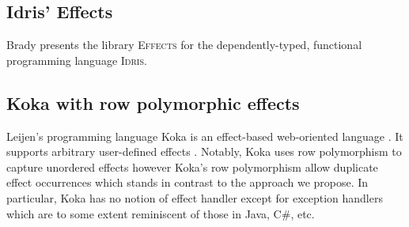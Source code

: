 
\subsection{Idris' Effects}
Brady \cite{Brady2013} presents the library {\scshape{Effects}} for the dependently-typed, functional programming language {\scshape{Idris}}.

\subsection{Koka with row polymorphic effects}
Leijen's programming language Koka is an effect-based web-oriented language \cite{Leijen2014}. 
It supports arbitrary user-defined effects \cite{Vazou2015}.
Notably, Koka uses row polymorphism to capture unordered effects however Koka's row polymorphism allow duplicate effect occurrences which stands in contrast to the approach we propose.
In particular, Koka has no notion of effect handler except for exception handlers which are to some extent reminiscent of those in Java, C\#, etc.